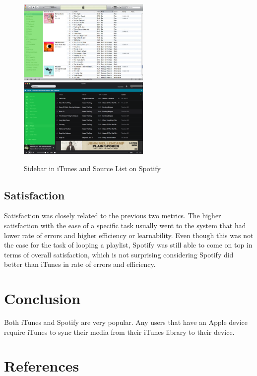 \documentclass[11pt]{article}
\begin{document}
\begin{figure}[H] %
   \centering
   \includegraphics[width=2.5in]{iTunes10_sidebar.jpg}
   \includegraphics[width=2.5in]{spotify_mac_sidebar.png}
   \caption{Sidebar in iTunes and Source List on Spotify}                                    
   \label{fig:iTunes10_and_spotify}
\end{figure}

\subsection{Satisfaction}
Satisfaction was closely related to the previous two metrics. The higher satisfaction with the ease of a specific task usually went to the system that had lower rate of errors and higher efficiency or learnability. Even though this was not the case for the task of looping a playlist, Spotify was still able to come on top in terms of overall satisfaction, which is not surprising considering Spotify did better than iTunes in rate of errors and efficiency.

\section{Conclusion}
Both iTunes and Spotify are very popular. Any users that have an Apple device require iTunes to sync their media from their iTunes library to their device. 
\section{References}
\end{document}
